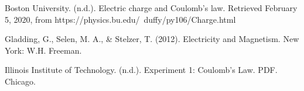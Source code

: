 \documentclass [12pt, letterpaper, twoside] {article}
\begin{document}
  Boston University. (n.d.). Electric charge and Coulomb's law. Retrieved February 5, 2020, from https://physics.bu.edu/~duffy/py106/Charge.html

  Gladding, G., Selen, M. A., \& Stelzer, T. (2012). Electricity and Magnetism. New York: W.H. Freeman.

  Illinois Institute of Technology. (n.d.). Experiment 1: Coulomb's Law. PDF. Chicago.
\end{document}
